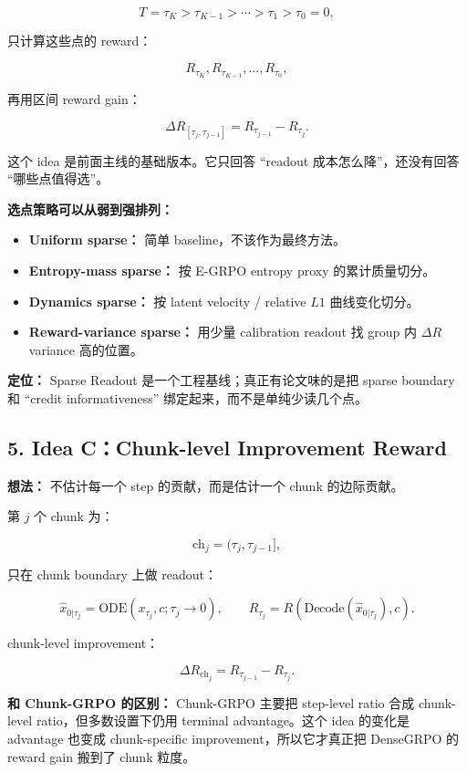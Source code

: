 \[
T = \tau_K > \tau_{K-1} > \cdots > \tau_1 > \tau_0 = 0,
\]

只计算这些点的 reward：

\[
R_{\tau_K}, R_{\tau_{K-1}}, \ldots, R_{\tau_0},
\]

再用区间 reward gain：

\[
\Delta R_{[\tau_j,\tau_{j-1}]}
= R_{\tau_{j-1}} - R_{\tau_j}.
\]

这个 idea 是前面主线的基础版本。它只回答 ``readout 成本怎么降''，还没有回答 ``哪些点值得选''。

\textbf{选点策略可以从弱到强排列：}

\begin{itemize}[leftmargin=1.5em]
  \item \textbf{Uniform sparse：} 简单 baseline，不该作为最终方法。
  \item \textbf{Entropy-mass sparse：} 按 E-GRPO entropy proxy 的累计质量切分。
  \item \textbf{Dynamics sparse：} 按 latent velocity / relative \(L1\) 曲线变化切分。
  \item \textbf{Reward-variance sparse：} 用少量 calibration readout 找 group 内 \(\Delta R\) variance 高的位置。
\end{itemize}

\begin{summarybox}
\textbf{定位：} Sparse Readout 是一个工程基线；真正有论文味的是把 sparse boundary 和 ``credit informativeness'' 绑定起来，而不是单纯少读几个点。
\end{summarybox}

\subsection{5. Idea C：Chunk-level Improvement Reward}

\textbf{想法：} 不估计每一个 step 的贡献，而是估计一个 chunk 的边际贡献。

第 \(j\) 个 chunk 为：

\[
\mathrm{ch}_j=(\tau_j,\tau_{j-1}],
\]

只在 chunk boundary 上做 readout：

\[
\hat{x}_{0|\tau_j}
=
\mathrm{ODE}(x_{\tau_j},c;\tau_j\rightarrow 0),
\qquad
R_{\tau_j}=R(\mathrm{Decode}(\hat{x}_{0|\tau_j}),c).
\]

chunk-level improvement：

\[
\Delta R_{\mathrm{ch}_j}
=
R_{\tau_{j-1}}-R_{\tau_j}.
\]

\begin{warnbox}
\textbf{和 Chunk-GRPO 的区别：} Chunk-GRPO 主要把 step-level ratio 合成 chunk-level ratio，但多数设置下仍用 terminal advantage。这个 idea 的变化是 advantage 也变成 chunk-specific improvement，所以它才真正把 DenseGRPO 的 reward gain 搬到了 chunk 粒度。
\end{warnbox}

